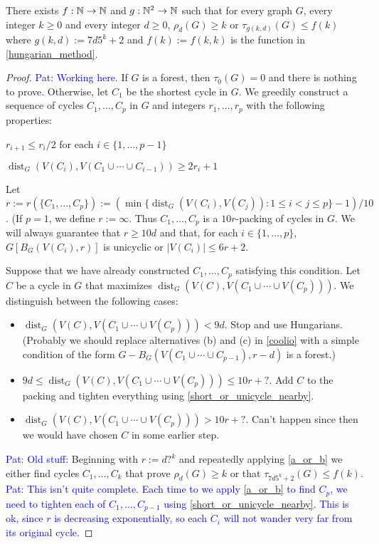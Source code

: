 \documentclass{patmorin}
\newcommand{\pat}[1]{\textcolor{Blue}{Pat: #1}}
\DeclareMathOperator{\dist}{dist}
\begin{document}
\begin{thm}
  There exists $f:\mathbb{N}\to\mathbb{N}$ and $g:\mathbb{N}^2\to\mathbb{N}$ such that for every graph $G$, every integer $k\ge 0$ and every integer $d\ge 0$, $\rho_d(G)\ge k$ or $\tau_{g(k,d)}(G)\le f(k)$ where $g(k,d):=7d5^k+2$ and $f(k):=f(k,k)$ is the function in \cref{hungarian_method}.
\end{thm}

\begin{proof}
  \pat{Working here.}
  If $G$ is a forest, then $\tau_0(G)=0$ and there is nothing to prove. Otherwise, let $C_1$ be the shortest cycle in $G$.  We greedily construct a sequence of cycles $C_1,\ldots,C_p$ in $G$ and integers $r_1,\ldots,r_p$ with the following properties:
  \begin{compactenum}
    \item $r_{i+1}\le r_i/2$ for each $i\in\{1,\ldots,p-1\}$
    \item $\dist_G(V(C_i),V(C_1\cup\cdots\cup C_{i-1}))\ge 2r_i+1$
  \end{compactenum}Let $r:=r(\{C_1,\ldots,C_p\}):=(\min\{\dist_G(V(C_i),V(C_j)): 1\le i < j \le p\}-1)/10$. (If $p=1$, we define $r:=\infty$.  Thus $C_1,\ldots,C_p$ is a $10r$-packing of cycles in $G$.  We will always guarantee that $r\ge 10d$ and that, for each $i\in\{1,\ldots,p\}$, $G[B_G(V(C_i),r)]$ is unicyclic or $|V(C_i)|\le 6r+2$.

  Suppose that we have already constructed $C_1,\ldots,C_p$ satisfying this condition.  Let $C$ be a cycle in $G$ that maximizes $\dist_G(V(C),V(C_1\cup\cdots\cup V(C_p)))$.  We distinguish between the following cases:
  \begin{itemize}
    \item $\dist_G(V(C),V(C_1\cup\cdots\cup V(C_p))) < 9d$.  Stop and use Hungarians.  (Probably we should replace alternatives (b) and (c) in \cref{coolio} with a simple condition of the form $G-B_G(V(C_1\cup\cdots\cup C_{p-1}),r-d)$ is a forest.)
    \item $9d\le \dist_G(V(C),V(C_1\cup\cdots\cup V(C_p)))\le 10r+?$.  Add $C$ to the packing and tighten everything using \cref{short_or_unicycle_nearby}.
    \item $\dist_G(V(C),V(C_1\cup\cdots\cup V(C_p)))> 10r+?$.  Can't happen since then we would have chosen $C$ in some earlier step.
  \end{itemize}




  \pat{Old stuff:}
  Beginning with $r:=d?^k$ and repeatedly applying \cref{a_or_b} we either find cycles $C_1,\ldots,C_k$ that prove $\rho_d(G)\ge k$ or that $\tau_{7d5^k+2}(G) \le f(k)$.  \pat{This isn't quite complete.  Each time to we apply \cref{a_or_b} to find $C_p$, we need to tighten each of $C_1,\ldots,C_{p-1}$ using \cref{short_or_unicycle_nearby}. This is ok, since $r$ is decreasing exponentially, so each $C_i$ will not wander very far from its original cycle.}
\end{proof}
\end{document}
